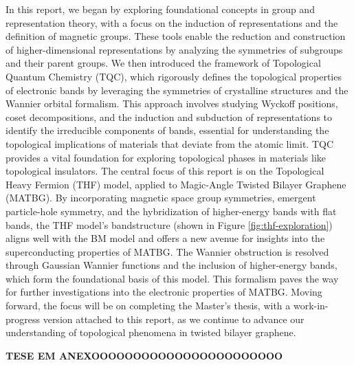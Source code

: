 \documentclass[12pt]{report}
\begin{document}
In this report, we began by exploring foundational concepts in group and representation theory, with a focus on the induction of representations and the definition of magnetic groups. These tools enable the reduction and construction of higher-dimensional representations by analyzing the symmetries of subgroups and their parent groups. We then introduced the framework of Topological Quantum Chemistry (TQC), which rigorously defines the topological properties of electronic bands by leveraging the symmetries of crystalline structures and the Wannier orbital formalism. This approach involves studying Wyckoff positions, coset decompositions, and the induction and subduction of representations to identify the irreducible components of bands, essential for understanding the topological implications of materials that deviate from the atomic limit. TQC provides a vital foundation for exploring topological phases in materials like topological insulators. The central focus of this report is on the Topological Heavy Fermion (THF) model, applied to Magic-Angle Twisted Bilayer Graphene (MATBG). By incorporating magnetic space group symmetries, emergent particle-hole symmetry, and the hybridization of higher-energy bands with flat bands, the THF model’s bandstructure (shown in Figure \ref{fig:thf-exploration}) aligns well with the BM model \cite{macdonald2011, topoheavyfermion2022} and offers a new avenue for insights into the superconducting properties of MATBG. The Wannier obstruction is resolved through Gaussian Wannier functions and the inclusion of higher-energy bands, which form the foundational basis of this model. This formalism paves the way for further investigations into the electronic properties of MATBG. Moving forward, the focus will be on completing the Master's thesis, with a work-in-progress version attached to this report, as we continue to advance our understanding of topological phenomena in twisted bilayer graphene.

\textbf{TESE EM ANEXOOOOOOOOOOOOOOOOOOOOOOO}
\end{document}
